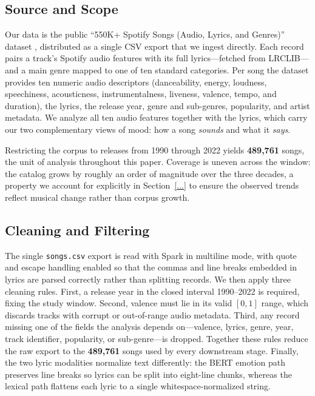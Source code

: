 \documentclass[conference]{IEEEtran}
\begin{document}
\subsection{Source and Scope}
Our data is the public ``550K+ Spotify Songs (Audio, Lyrics, and Genres)''
dataset \cite{b_dataset}, distributed as a single CSV export that we ingest
directly. Each record pairs a track's Spotify audio features with its full
lyrics---fetched from LRCLIB---and a main genre mapped to one of ten standard
categories. Per song the dataset provides ten numeric audio descriptors
(danceability, energy, loudness, speechiness, acousticness, instrumentalness,
liveness, valence, tempo, and duration), the lyrics, the release year, genre and
sub-genres, popularity, and artist metadata. We analyze all ten audio features
together with the lyrics, which carry our two complementary views of mood:
how a song \emph{sounds} and what it \emph{says}.

Restricting the corpus to releases from 1990 through 2022 yields
\textbf{489{,}761} songs, the unit of analysis throughout this paper. Coverage
is uneven across the window: the catalog grows by roughly an order of magnitude
over the three decades, a property we account for explicitly in
Section~\ref{...} to ensure the observed trends reflect musical change rather
than corpus growth.

\subsection{Cleaning and Filtering}
The single \texttt{songs.csv} export is read with Spark in multiline mode, with
quote and escape handling enabled so that the commas and line breaks embedded in
lyrics are parsed correctly rather than splitting records. We then apply three
cleaning rules. First, a release year in the closed interval 1990--2022 is
required, fixing the study window. Second, valence must lie in its valid
$[0,1]$ range, which discards tracks with corrupt or out-of-range audio
metadata. Third, any record missing one of the fields the analysis depends
on---valence, lyrics, genre, year, track identifier, popularity, or
sub-genre---is dropped. Together these rules reduce the raw export to the
\textbf{489{,}761} songs used by every downstream stage. Finally, the two lyric
modalities normalize text differently: the BERT emotion path preserves line
breaks so lyrics can be split into eight-line chunks, whereas the lexical path
flattens each lyric to a single whitespace-normalized string.
\end{document}
